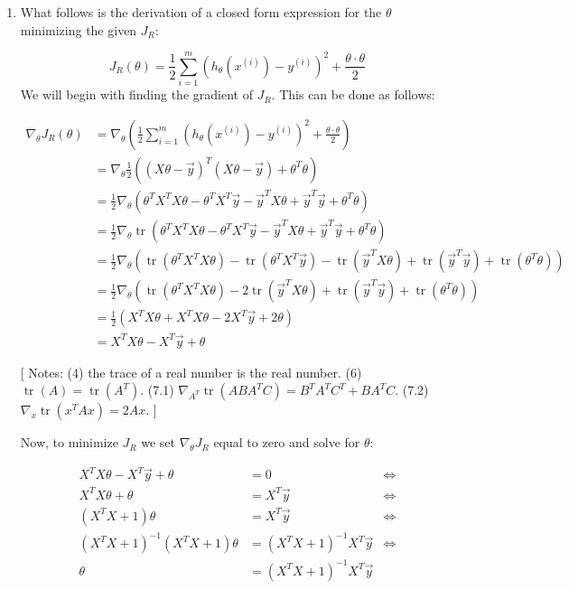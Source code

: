 \documentclass[12pt]{article}
\DeclareMathOperator{\Tr}{tr}
\begin{document}
\begin{enumerate}
   \item What follows is the derivation of a closed form expression for the  $\theta$ minimizing the given $J_R$:
   
   \[
   J_R(\theta) = \frac{1}{2} \sum_{i=1}^{m} \left( h_\theta (x^{(i)}) - y^{(i)} \right)^2 + \frac{\theta \cdot \theta}{2} 
   \]
   We will begin with finding the gradient of $J_R$. This can be done as follows:
   
   \begin{align}
   \nabla_\theta J_R(\theta) &= \nabla_\theta \left( \frac{1}{2} \sum_{i=1}^{m} \left( h_\theta (x^{(i)}) - y^{(i)} \right)^2 + \frac{\theta \cdot \theta}{2} \right)   \\
   &= \nabla_\theta \frac{1}{2} \left((X\theta - \vec{y})^T(X\theta - \vec{y}) + \theta^T \theta \right) \\
   &= \frac{1}{2} \nabla_\theta \left( \theta^TX^TX\theta - \theta^TX^T\vec{y} - \vec{y}^TX\theta + \vec{y}^T\vec{y} + \theta^T\theta \right) \\
   &= \frac{1}{2} \nabla_\theta \Tr \left( \theta^TX^TX\theta - \theta^TX^T\vec{y} - \vec{y}^TX\theta + \vec{y}^T\vec{y} + \theta^T\theta \right) \\
   &= \frac{1}{2} \nabla_\theta \left( \Tr(\theta^TX^TX\theta) - \Tr( \theta^TX^T\vec{y}) - \Tr(\vec{y}^TX\theta) + \Tr(\vec{y}^T\vec{y}) + \Tr(\theta^T\theta) \right) \\
   &= \frac{1}{2} \nabla_\theta \left( \Tr(\theta^TX^TX\theta) - 2\Tr(\vec{y}^TX\theta) + \Tr(\vec{y}^T\vec{y}) + \Tr(\theta^T\theta) \right) \\
   &= \frac{1}{2} \left( X^TX\theta + X^TX\theta - 2X^T\vec{y} + 2\theta \right)  \\
   &= X^TX\theta - X^T\vec{y} + \theta
   \end{align}
   
  \small [ Notes: (4) the trace of a real number is the real number. (6) $\Tr(A) = \Tr(A^T)$. (7.1) $\nabla_{A^T} \Tr (ABA^TC) = B^TA^TC^T + BA^TC$. (7.2) $\nabla_x\Tr(x^TAx) = 2Ax.$
  ]
  
  Now, to minimize $J_R$ we set $\nabla_\theta J_R$ equal to zero and solve for $\theta$:
  
  \begin{align*}
  X^TX\theta - X^T\vec{y} + \theta &= 0 &\Longleftrightarrow \\
  X^TX\theta + \theta &=  X^T\vec{y} &\Longleftrightarrow \\
  (X^TX + 1)\theta &=  X^T\vec{y} &\Longleftrightarrow \\
  (X^TX + 1)^{-1}(X^TX + 1)\theta &=  (X^TX + 1)^{-1}X^T\vec{y} &\Longleftrightarrow \\
  \theta &=  (X^TX + 1)^{-1}X^T\vec{y} & 
  \end{align*}
  

\end{enumerate}
\end{document}
